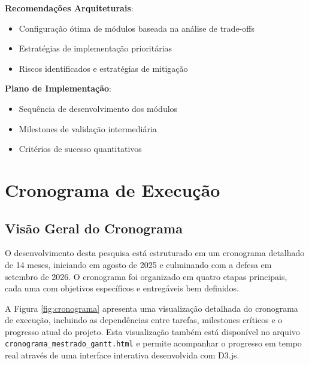 \textbf{Recomendações Arquiteturais}:
\begin{itemize}
\item Configuração ótima de módulos baseada na análise de trade-offs
\item Estratégias de implementação prioritárias
\item Riscos identificados e estratégias de mitigação
\end{itemize}

\textbf{Plano de Implementação}:
\begin{itemize}
\item Sequência de desenvolvimento dos módulos
\item Milestones de validação intermediária
\item Critérios de sucesso quantitativos
\end{itemize}

\section{Cronograma de Execução}

\subsection{Visão Geral do Cronograma}

O desenvolvimento desta pesquisa está estruturado em um cronograma detalhado de 14 meses, iniciando em agosto de 2025 e culminando com a defesa em setembro de 2026. O cronograma foi organizado em quatro etapas principais, cada uma com objetivos específicos e entregáveis bem definidos.

A Figura \ref{fig:cronograma} apresenta uma visualização detalhada do cronograma de execução, incluindo as dependências entre tarefas, milestones críticos e o progresso atual do projeto. Esta visualização também está disponível no arquivo \texttt{cronograma\_mestrado\_gantt.html} e permite acompanhar o progresso em tempo real através de uma interface interativa desenvolvida com D3.js.

